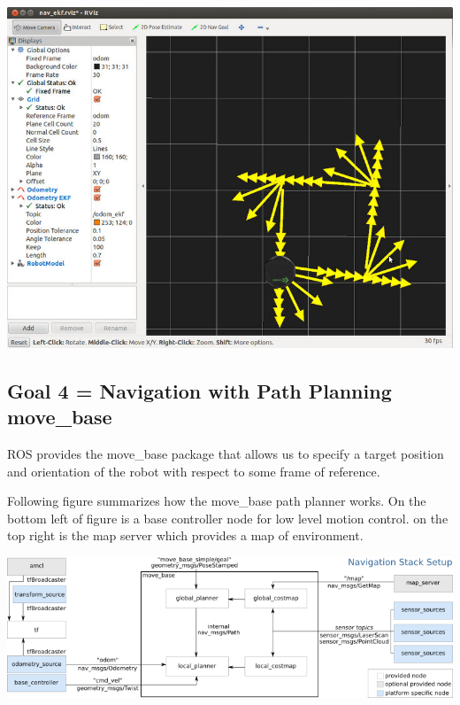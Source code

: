 \documentclass[10pt,a4paper]{article}
\begin{document}
\begin{center}
\includegraphics[width=\textwidth]{images/square_py.jpg}\\
\end{center}

\subsection{Goal 4 = Navigation with Path Planning move\_base}
ROS provides the move\_base package that allows us to specify a target position and orientation of the robot with respect to some frame of reference.

Following figure summarizes how the move\_base path planner works. On the bottom left of figure is a base controller node for low level motion control. on the top right is the map server which provides a map of environment.

\begin{center}
\includegraphics[width=\textwidth]{images/overview_small.png}
\end{center}
\end{document}
